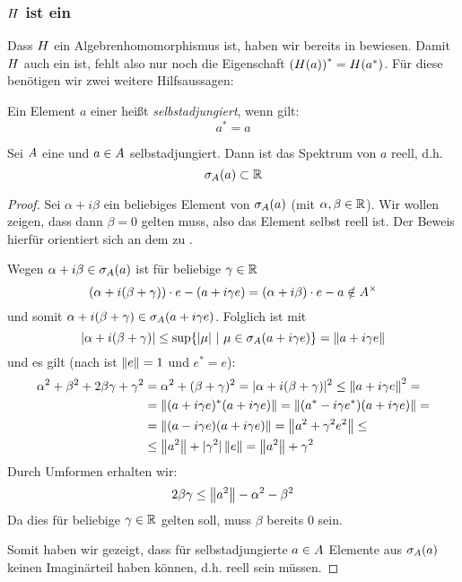 \subsubsection{$H$ ist ein \CAlgHom}\label{sec:CAlgHom}

Dass $H$ ein Algebrenhomomorphismus ist, haben wir bereits in  bewiesen. Damit $H$ auch ein \CAlgHom{} ist, fehlt also nur noch die Eigenschaft $\left(H(a)\right)^* = H(a^*)$. Für diese benötigen wir zwei weitere Hilfsaussagen:

\begin{defn}[selbstadjungiert]\label{defn:selbstadjungiert}
Ein Element $a$ einer \CAlg{} heißt \emph{selbstadjungiert}, wenn gilt:
	\[a^* = a\]
\end{defn}

\begin{prop}\label{prop:Spektrum-reell}
Sei $A$ eine \CAlg{} und $a \in A$ selbstadjungiert. Dann ist das Spektrum von $a$ reell, d.h.
	\[\sigma_A(a) \subset \mathbb{R}\]
\end{prop}

\begin{proof}
Sei $\alpha + i\beta$ ein beliebiges Element von $\sigma_A(a)$ (mit $\alpha,\beta \in \mathbb{R}$). Wir wollen zeigen, dass dann $\beta = 0$ gelten muss, also das Element selbst reell ist. Der Beweis hierfür orientiert sich an dem zu \cite[Lemma IX.3.3(c)]{Werner2011}.

Wegen $\alpha +i\beta \in \sigma_A(a)$ ist	für beliebige $\gamma \in \mathbb{R}$
	\[(\alpha + i(\beta + \gamma))\cdot e - (a + i\gamma e) = (\alpha+i\beta)\cdot e - a \notin A^\times\]
und somit $\alpha + i(\beta + \gamma) \in \sigma_A(a+ i\gamma e)$. Folglich ist mit 
	\[|\alpha + i(\beta + \gamma)| \leq \sup\{|\mu| ~|~ \mu \in \sigma_A(a+ i\gamma e)\} = \left\lVert a+ i\gamma e\right\rVert\]
und es gilt (nach  ist $\left\lVert e\right\rVert = 1$ und $e^* = e$):
	\begin{align*}
	\alpha^2+\beta^2+2\beta\gamma+\gamma^2 &= \alpha^2 + (\beta+\gamma)^2 = |\alpha + i(\beta + \gamma)|^2 \leq \left\lVert a+ i\gamma e\right\rVert^2 = \\
	&= \left\lVert(a+ i\gamma e)^*(a+ i\gamma e)\right\rVert = \left\lVert(a^* - i\gamma e^*)(a+ i\gamma e)\right\rVert = \\
	&=\left\lVert(a - i\gamma e)(a+ i\gamma e)\right\rVert = \left\lVert a^2 + \gamma^2 e^2\right\rVert \leq \\
	&\leq \left\lVert a^2\right\rVert + |\gamma^2|\left\lVert e\right\rVert = \left\lVert a^2\right\rVert + \gamma^2
	\end{align*}
Durch Umformen erhalten wir:
	\[2\beta \gamma \leq \left\lVert a^2\right\rVert - \alpha^2 - \beta^2\]
Da dies für beliebige $\gamma \in \mathbb{R}$ gelten soll, muss $\beta$ bereits $0$ sein.

Somit haben wir gezeigt, dass für selbstadjungierte $a \in A$ Elemente aus $\sigma_A(a)$ keinen Imaginärteil haben können, d.h. reell sein müssen.
\end{proof}

